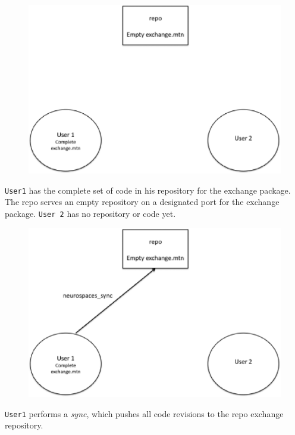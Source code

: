 \documentclass[12pt]{article}
\begin{document}
\begin{figure}[h]
\centering
   \includegraphics[scale=0.5]{figures/repo1.eps}
   \label{fig:R1}
\end{figure}

{\tt User1} has the complete set of code in his repository for the exchange package. The repo serves an empty repository on a designated port for the exchange package. {\tt User 2} has no repository or code yet.

\begin{figure}[h]
\centering
   \includegraphics[scale=0.5]{figures/repo2.eps}
   \label{fig:R2}
\end{figure}

{\tt User1} performs a {\it sync}, which pushes all code revisions to the repo exchange repository.
\end{document}
